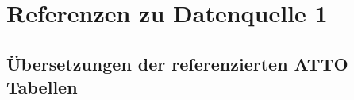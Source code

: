 
\chapter{Referenzen zu Datenquelle 1}
    
    

    





    \section{Übersetzungen der referenzierten ATTO Tabellen}
    

